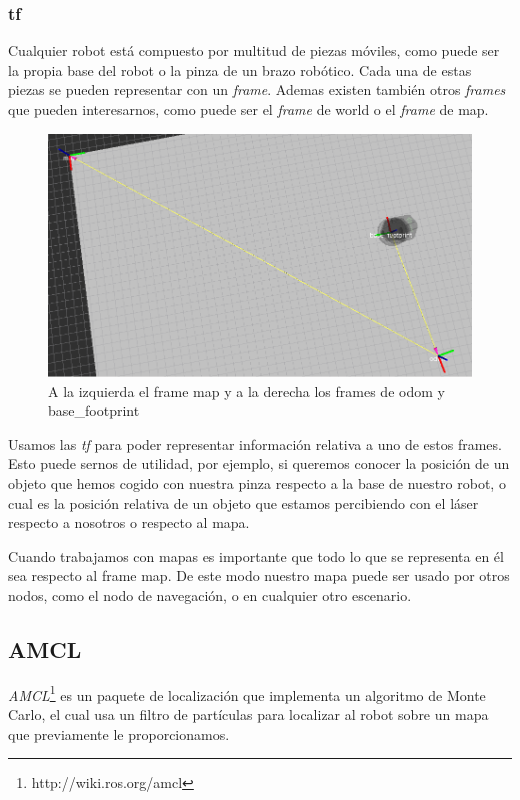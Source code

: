 \subsubsection{tf}
\label{subsubsec:tf}
Cualquier robot está compuesto por multitud de piezas móviles, como puede ser la propia base del robot o la pinza de un brazo robótico. Cada una de estas piezas se pueden representar con un \textit{frame}. Ademas existen también otros \textit{frames} que pueden interesarnos, como puede ser el \textit{frame} de world o el \textit{frame} de map.
\begin{figure} [hbtp]
  \begin{center}
    \includegraphics[width=12cm]{img/cap4/frames}
  \end{center}
  \caption{A la izquierda el frame map y a la derecha los frames de odom y base\_footprint}
  \label{fig:frames}
\end{figure}

Usamos las \textit{tf} para poder representar información relativa a uno de estos frames. Esto puede sernos de utilidad, por ejemplo, si queremos conocer la posición de un objeto que hemos cogido con nuestra pinza respecto a la base de nuestro robot, o cual es la posición relativa de un objeto que estamos percibiendo con el láser respecto a nosotros o respecto al mapa.

Cuando trabajamos con mapas es importante que todo lo que se representa en él sea respecto al frame map. De este modo nuestro mapa puede ser usado por otros nodos, como el nodo de navegación, o en cualquier otro escenario. \pagebreak


\subsection{AMCL}
\label{sec:amcl}
\textit{AMCL}\footnote{http://wiki.ros.org/amcl} es un paquete de localización que implementa un algoritmo de Monte Carlo, el cual usa un filtro de partículas para localizar al robot sobre un mapa que previamente le proporcionamos.
